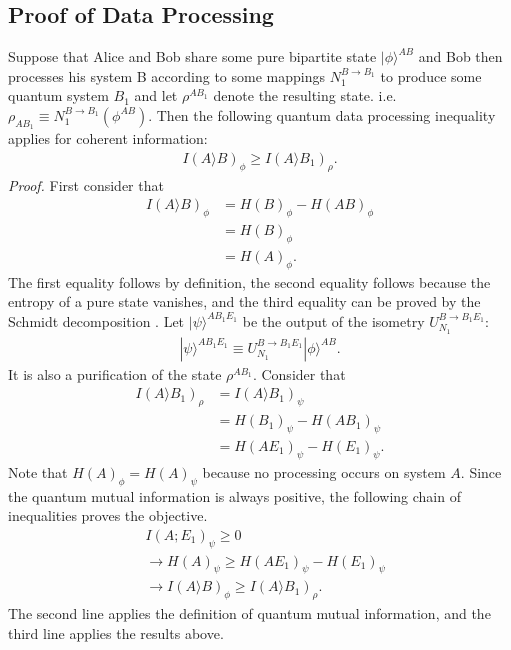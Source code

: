 \subsection{Proof of Data Processing}\label{sec:pfDataProcess}
Suppose that Alice and Bob share some pure bipartite state $|\phi \rangle ^{AB}$ and 
Bob then processes his system B according to some mappings $N_1^{B\to B_1}$ to produce some quantum system $B_1$ and let $\rho ^{AB_1}$ denote the resulting state. i.e.
$\rho_{AB_1} \equiv N_1^{B\to B_1}(\phi ^{AB})$. Then the following quantum data processing inequality applies for coherent information:
\begin{align}
I(A\rangle B)_{\phi} \geq I(A\rangle B_1)_{\rho}.
\end{align}
\textit{Proof.} First consider that
\begin{align}
I(A\rangle B)_{\phi} &= H(B)_\phi -H(AB)_\phi \nonumber \\
&=H(B)_\phi \nonumber \\
&=H(A)_\phi.
\end{align}
The first equality follows by definition, the second equality follows because the entropy of a pure state vanishes, and the third equality can be proved by the Schmidt decomposition \cite{CtoQ}. Let $|\psi \rangle ^{AB_1E_1}$ be the output of the isometry $U_{N_1}^{B \to B_1E_1}$:
\begin{align}
|\psi \rangle ^{AB_1E_1} \equiv U_{N_1}^{B \to B_1E_1}|\phi \rangle ^{AB}.
\end{align}
It is also a purification of the state $\rho ^{AB_1}$. Consider that
\begin{align}
I(A \rangle B_1)_\rho &= I(A \rangle B_1)_\psi \nonumber \\
&=H(B_1)_\psi - H(AB_1)_\psi \nonumber \\
&=H(AE_1)_\psi - H(E_1)_\psi.
\end{align}
Note that $H(A)_\phi = H(A)_\psi$ because no processing occurs on system $A$. Since the quantum mutual information is always positive, the following chain of inequalities proves the objective.
\begin{align}
&I(A;E_1)_\psi \geq 0 \nonumber \\
&\rightarrow H(A)_\psi \geq H(AE_1)_\psi - H(E_1)_\psi \nonumber \\
&\rightarrow I(A\rangle B)_\phi \geq I(A\rangle B_1)_\rho.
\end{align}
The second line applies the definition of quantum mutual information, and the third line applies the results above.